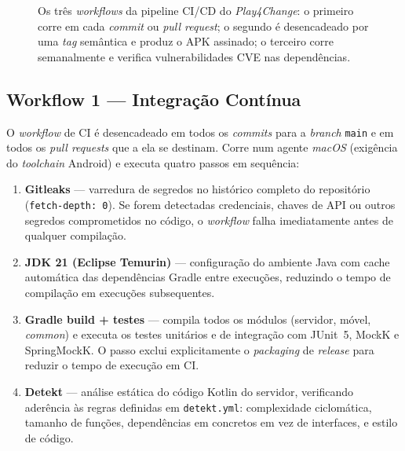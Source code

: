 \begin{figure}[htbp]
{
	}%
	\caption[Pipeline CI/CD do Play4Change com os três workflows GitHub Actions]{Os três \emph{workflows} da pipeline CI/CD do \emph{Play4Change}: o primeiro corre em cada \emph{commit} ou \emph{pull request}; o segundo é desencadeado por uma \emph{tag} semântica e produz o APK assinado; o terceiro corre semanalmente e verifica vulnerabilidades CVE nas dependências.}
	\label{fig:cicd-pipeline}
\end{figure}

\subsection*{Workflow 1 --- Integração Contínua}

O \emph{workflow} de CI é desencadeado em todos os \emph{commits} para a \emph{branch} \texttt{main} e em todos os \emph{pull requests} que a ela se destinam. Corre num agente \emph{macOS} (exigência do \emph{toolchain} Android) e executa quatro passos em sequência:

\begin{enumerate}
	\item \textbf{Gitleaks} --- varredura de segredos no histórico completo do repositório (\texttt{fetch-depth:~0}). Se forem detectadas credenciais, chaves de API ou outros segredos comprometidos no código, o \emph{workflow} falha imediatamente antes de qualquer compilação.
	\item \textbf{JDK 21 (Eclipse Temurin)} --- configuração do ambiente Java com cache automática das dependências Gradle entre execuções, reduzindo o tempo de compilação em execuções subsequentes.
	\item \textbf{Gradle build + testes} --- compila todos os módulos (servidor, móvel, \emph{common}) e executa os testes unitários e de integração com JUnit~5, MockK e SpringMockK. O passo exclui explicitamente o \emph{packaging} de \emph{release} para reduzir o tempo de execução em CI.
	\item \textbf{Detekt} --- análise estática do código Kotlin do servidor, verificando aderência às regras definidas em \texttt{detekt.yml}: complexidade ciclomática, tamanho de funções, dependências em concretos em vez de interfaces, e estilo de código.
\end{enumerate}

